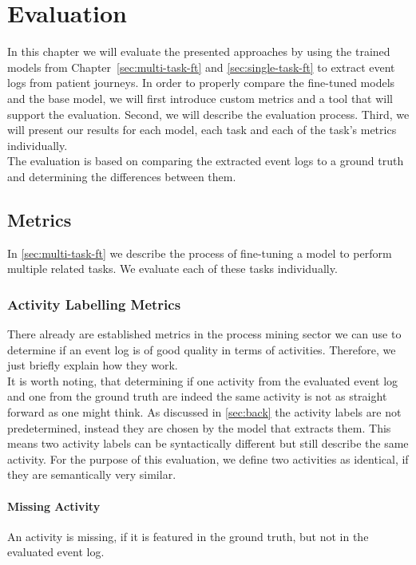 \section{Evaluation}\label{sec:eval}
In this chapter we will evaluate the presented approaches by using the trained models from Chapter~\ref{sec:multi-task-ft} and \ref{sec:single-task-ft} to extract event logs from patient journeys. In order to properly compare the fine-tuned models and the base model, we will first introduce custom metrics and a tool that will support the evaluation. Second, we will describe the evaluation process. Third, we will present our results for each model, each task and each of the task's metrics individually.\\
The evaluation is based on comparing the extracted event logs to a ground truth and determining the differences between them.

\subsection{Metrics}\label{sec:metrics}
In \ref{sec:multi-task-ft} we describe the process of fine-tuning a model to perform multiple related tasks. We evaluate each of these tasks individually.

\subsubsection{Activity Labelling Metrics}\label{sec:activity_metrics}
There already are established metrics in the process mining sector we can use to determine if an event log is of good quality in terms of activities. Therefore, we just briefly explain how they work.\\
It is worth noting, that determining if one activity from the evaluated event log and one from the ground truth are indeed the same activity is not as straight forward as one might think. As discussed in \ref{sec:back} the activity labels are not predetermined, instead they are chosen by the model that extracts them. This means two activity labels can be syntactically different but still describe the same activity. For the purpose of this evaluation, we define two activities as identical, if they are semantically very similar.
\paragraph{Missing Activity} An activity is missing, if it is featured in the ground truth, but not in the evaluated event log. 
